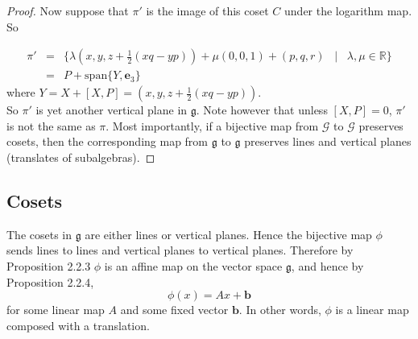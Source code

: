 \documentclass[honours]{UNSWthesis}
\newcommand{\R}{\mathbb{R}}
\newcommand{\G}{\mathcal{G}}
\newcommand{\g}{\mathfrak{g}}
\newcommand{\1}{\mathbf{e}_{1}}
\newcommand{\2}{\mathbf{e}_{3}}
\newcommand{\3}{\mathbf{e}_{3}}
\begin{document}
\begin{proof}
Now suppose that $\pi'$ is the image of this coset $C$ under the logarithm map. So 

\begin{eqnarray*}
\pi' &=& \{ \lambda( x, y, z+\frac{1}{2}(xq-yp))+\mu(0,0,1)+(p,q,r) \;\;\;|\;\;\; \lambda,\mu \in \R \} \\
&=& P+\text{span}\{Y,\3 \}
\end{eqnarray*}
where $Y=X+[X,P]=( x, y, z+\frac{1}{2}(xq-yp))$. \\
So $\pi'$ is yet another vertical plane in $\g$. Note however that unless $[X,P]=0$, $\pi'$ is not the same as $\pi$. Most importantly, if a bijective map from $\G$ to $\G$ preserves cosets, then the corresponding map from $\g$ to $\g$ preserves lines and vertical planes (translates of subalgebras).
\end{proof}

\subsection{Cosets}
The cosets in $\g$ are either lines or vertical planes. Hence the bijective map $\phi$ sends lines to lines and vertical planes to vertical planes. Therefore by Proposition 2.2.3 $\phi$ is an affine map on the vector space $\g$, and hence by Proposition 2.2.4, 
\[
\phi(x)=Ax+\mathbf{b}
\]
for some linear map $A$ and some fixed vector $\mathbf{b}$. In other words, $\phi$ is a linear map composed with a translation. 
\end{document}
